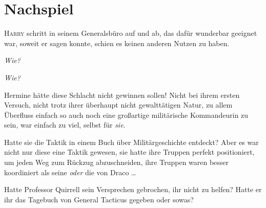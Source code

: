 
\section{Nachspiel}

\lettrine{H}{arry} schritt in seinem Generalsbüro auf und ab, das dafür wunderbar geeignet war, soweit er sagen konnte, schien es keinen anderen Nutzen zu haben.

\emph{Wie?}

\emph{Wie?}

Hermine hätte diese Schlacht nicht gewinnen sollen! Nicht bei ihrem ersten Versuch, nicht trotz ihrer überhaupt nicht gewalttätigen Natur, zu allem Überfluss einfach so auch noch eine großartige militärische Kommandeurin zu sein, war einfach zu viel, selbst für \emph{sie}.

Hatte sie die Taktik in einem Buch über Militärgeschichte entdeckt? Aber es war nicht nur diese eine Taktik gewesen, sie hatte ihre Truppen perfekt positioniert, um jeden Weg zum Rückzug abzuschneiden, ihre Truppen waren besser koordiniert als seine \emph{oder} die von Draco …

Hatte Professor Quirrell sein Versprechen gebrochen, ihr nicht zu helfen? Hatte er ihr das Tagebuch von General Tacticus gegeben oder sowas?%

